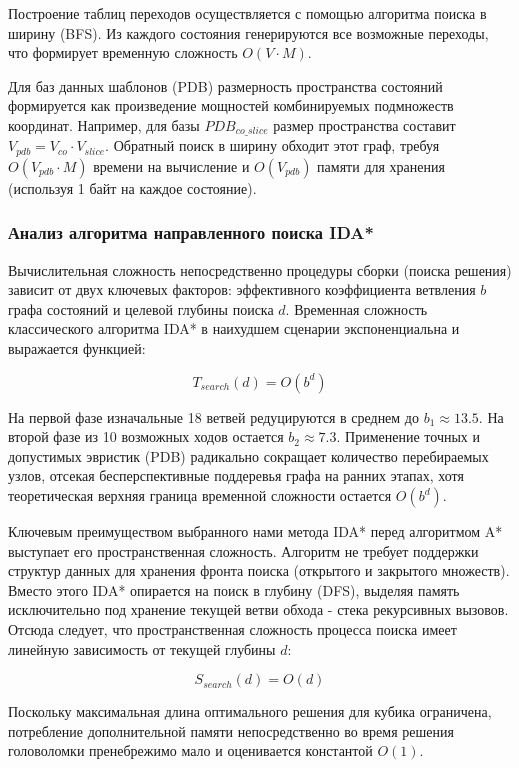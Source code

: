 \documentclass{article}
\begin{document}
Построение таблиц переходов осуществляется с помощью алгоритма поиска в ширину (BFS). Из каждого состояния генерируются все возможные переходы, что формирует временную сложность $O(V \cdot M)$.

Для баз данных шаблонов (PDB) размерность пространства состояний формируется как произведение мощностей комбинируемых подмножеств координат. Например, для базы $PDB_{co\_slice}$ размер пространства составит $V_{pdb} = V_{co} \cdot V_{slice}$. Обратный поиск в ширину обходит этот граф, требуя $O(V_{pdb} \cdot M)$ времени на вычисление и $O(V_{pdb})$ памяти для хранения (используя 1 байт на каждое состояние). 

\subsubsection{Анализ алгоритма направленного поиска IDA*}
Вычислительная сложность непосредственно процедуры сборки (поиска решения) зависит от двух ключевых факторов: эффективного коэффициента ветвления $b$ графа состояний и целевой глубины поиска $d$.
Временная сложность классического алгоритма IDA* в наихудшем сценарии экспоненциальна и выражается функцией:

\begin{equation}
T_{search}(d) = O(b^d)
\end{equation}

На первой фазе изначальные 18 ветвей редуцируются в среднем до $b_1\approx13.5$. На второй фазе из 10 возможных ходов остается $b_2 \approx 7.3$. Применение точных и допустимых эвристик (PDB) радикально сокращает количество перебираемых узлов, отсекая бесперспективные поддеревья графа на ранних этапах, хотя теоретическая верхняя граница временной сложности остается $O(b^d)$.

Ключевым преимуществом выбранного нами метода IDA* перед алгоритмом A* выступает его пространственная сложность. Алгоритм не требует поддержки структур данных для хранения фронта поиска (открытого и закрытого множеств). Вместо этого IDA* опирается на поиск в глубину (DFS), выделяя память исключительно под хранение текущей ветви обхода - стека рекурсивных вызовов. Отсюда следует, что пространственная сложность процесса поиска имеет линейную зависимость от текущей глубины $d$:

\begin{equation}
S_{search}(d) = O(d)    
\end{equation}

Поскольку максимальная длина оптимального решения для кубика ограничена, потребление дополнительной памяти непосредственно во время решения головоломки пренебрежимо мало и оценивается константой $O(1)$.
\end{document}
